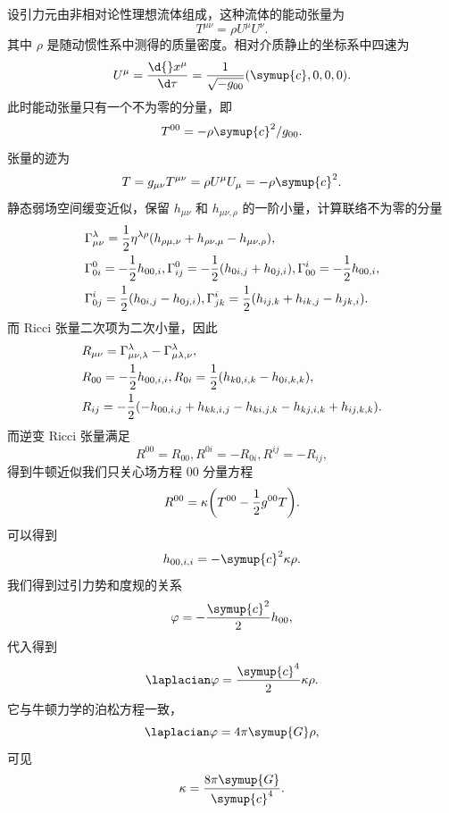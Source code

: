 \documentclass[UTF8, 12pt, a4paper, oneside, onecolumn, fontset=none]{ctexart}
\begin{document}
设引力元由非相对论性理想流体组成，这种流体的能动张量为
\begin{equation}
T^{\mu\nu}=\rho U^{\mu}U^{\nu}.
\end{equation}
其中 $\rho$ 是随动惯性系中测得的质量密度。相对介质静止的坐标系中四速为
\begin{equation}
U^{\mu}=\frac{\d{}x^{\mu}}{\d\tau}=\frac{1}{\sqrt{-g_{00}}}\mleft(\symup{c}, 0, 0, 0\mright).
\end{equation}
此时能动张量只有一个不为零的分量，即
\begin{equation}
T^{00}=-\rho\symup{c}^{2}/g_{00}.
\end{equation}
张量的迹为
\begin{equation}
T=g_{\mu\nu}T^{\mu\nu}=\rho U^{\mu}U_{\mu}=-\rho\symup{c}^{2}.
\end{equation}
静态弱场空间缓变近似，保留 $h_{\mu\nu}$ 和 $h_{\mu\nu,\rho}$ 的一阶小量，计算联络不为零的分量
\begin{align}
&\Gamma_{\mu\nu}^{\lambda}=\frac{1}{2}\eta^{\lambda\rho}\mleft(h_{\rho\mu,\nu}+h_{\rho\nu,\mu}-h_{\mu\nu,\rho}\mright),\\
&\Gamma_{0i}^{0}=-\frac{1}{2}h_{00, i},\Gamma_{ij}^{0}=-\frac{1}{2}\mleft(h_{0i, j}+h_{0j, i}\mright),\Gamma_{00}^{i}=-\frac{1}{2}h_{00, i},\\
&\Gamma_{0j}^{i}=\frac{1}{2}\mleft(h_{0i, j}-h_{0j, i}\mright),\Gamma_{jk}^{i}=\frac{1}{2}\mleft(h_{ij, k}+h_{ik, j}-h_{jk, i}\mright).
\end{align}
而 Ricci 张量二次项为二次小量，因此
\begin{align}
&R_{\mu\nu}=\Gamma_{\mu\nu,\lambda}^{\lambda}-\Gamma_{\mu\lambda,\nu}^{\lambda},\\
&R_{00}=-\frac{1}{2}h_{00, i, i}, R_{0i}=\frac{1}{2}\mleft(h_{k0, i, k}-h_{0i, k, k}\mright),\\
&R_{ij}=-\frac{1}{2}\mleft(-h_{00, i, j}+h_{kk, i, j}-h_{ki, j, k}-h_{kj, i, k}+h_{ij, k, k}\mright).
\end{align}
而逆变 Ricci 张量满足
\begin{equation}
R^{00}=R_{00}, R^{0i}=-R_{0i}, R^{ij}=-R_{ij},
\end{equation}
得到牛顿近似我们只关心场方程 00 分量方程
\begin{equation}
R^{00}=\kappa\mleft(T^{00}-\frac{1}{2}g^{00}T\mright).
\end{equation}
可以得到
\begin{equation}
h_{00, i, i}=-\symup{c}^{2}\kappa\rho.
\end{equation}
我们得到过引力势和度规的关系
\begin{equation}
\varphi=-\frac{\symup{c}^{2}}{2}h_{00},
\end{equation}
代入得到
\begin{equation}
\laplacian\varphi=\frac{\symup{c}^{4}}{2}\kappa\rho.
\end{equation}
它与牛顿力学的泊松方程一致，
\begin{equation}
\laplacian\varphi=4\pi\symup{G}\rho,
\end{equation}
可见
\begin{equation}
\kappa=\frac{8\pi\symup{G}}{\symup{c}^{4}}.
\end{equation}
\end{document}
